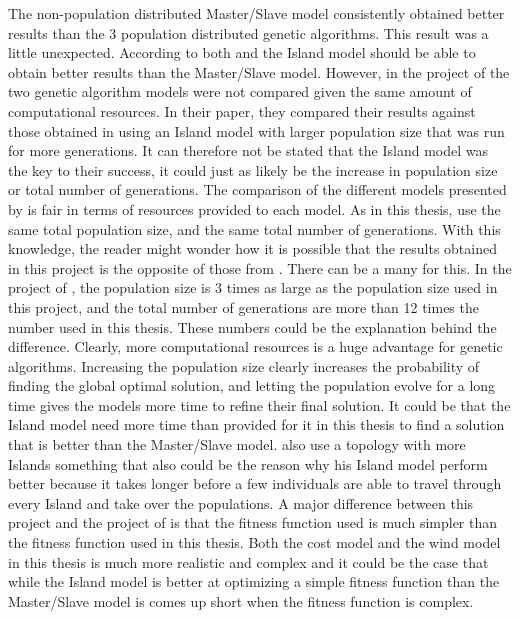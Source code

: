 \noindent The non-population distributed Master/Slave model consistently obtained better results than the 3 population distributed genetic algorithms. This result was a little unexpected. According to both \citep{Grady} and \citep{Huang} the Island model should be able to obtain better results than the Master/Slave model. However, in the project of \citep{Grady} the two genetic algorithm models were not compared given the same amount of computational resources. In their paper, they compared their results against those obtained in \citep{Mosetti} using an Island model with larger population size that was run for more generations. It can therefore not be stated that the Island model was the key to their success, it could just as likely be the increase in population size or total number of generations. The comparison of the different models presented by \citep{Huang} is fair in terms of resources provided to each model. As in this thesis, \citep{Huang} use the same total population size, and the same total number of generations. With this knowledge, the reader might wonder how it is possible that the results obtained in this project is the opposite of those from \citep{Huang}. There can be a many for this. In the project of \citep{Huang}, the population size is 3 times as large as the population size used in this project, and the total number of generations are more than 12 times the number used in this thesis. These numbers could be the explanation behind the difference. Clearly, more computational resources is a huge advantage for genetic algorithms. Increasing the population size clearly increases the probability of finding the global optimal solution, and letting the population evolve for a long time gives the models more time to refine their final solution. It could be that the Island model need more time than provided for it in this thesis to find a solution that is better than the Master/Slave model. \citep{Huang} also use a topology with more Islands something that also could be the reason why his Island model perform better because it takes longer before a few individuals are able to travel through every Island and take over the populations. A major difference between this project and the project of \citep{Huang} is that the fitness function used is much simpler than the fitness function used in this thesis. Both the cost model and the wind model in this thesis is much more realistic and complex and it could be the case that while the Island model is better at optimizing a simple fitness function than the Master/Slave model is comes up short when the fitness function is complex.\\

